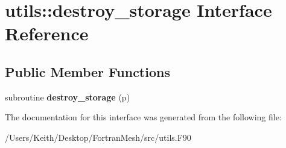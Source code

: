 \hypertarget{interfaceutils_1_1destroy__storage}{}\section{utils\+:\+:destroy\+\_\+storage Interface Reference}
\label{interfaceutils_1_1destroy__storage}
\subsection*{Public Member Functions}
\begin{DoxyCompactItemize}
\item 
subroutine {\bfseries destroy\+\_\+storage} (p)\hypertarget{interfaceutils_1_1destroy__storage_a1e875ec61ad094d099feb95efe275d50}{}\label{interfaceutils_1_1destroy__storage_a1e875ec61ad094d099feb95efe275d50}

\end{DoxyCompactItemize}


The documentation for this interface was generated from the following file\+:\begin{DoxyCompactItemize}
\item 
/\+Users/\+Keith/\+Desktop/\+Fortran\+Mesh/src/utils.\+F90\end{DoxyCompactItemize}
